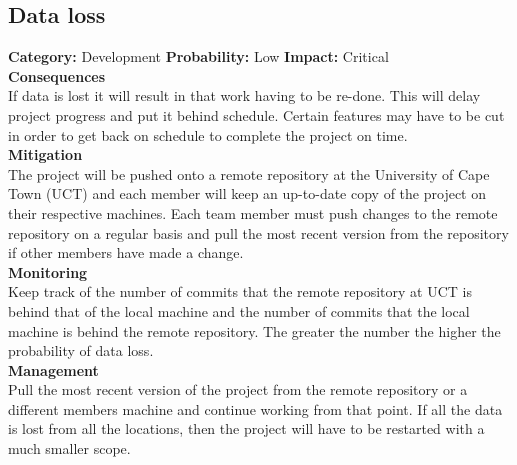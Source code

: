 \documentclass[a4paper,10pt]{article}
\begin{document}
		\subsection{Data loss}
		\textbf{Category:} Development\newline
		\textbf{Probability:} Low\newline
		\textbf{Impact:} Critical
		\\\textbf{Consequences}\\
		If data is lost it will result in that work having to be re-done. This will delay project progress and put it behind schedule. Certain features may have to be cut in order to get back on schedule to complete the project on time.
		\smallskip\\\textbf{Mitigation}\\
		The project will be pushed onto a remote repository at the University of Cape Town (UCT) and each member will keep an up-to-date copy of the project on their respective machines. Each team member must push changes to the remote repository on a regular basis and pull the most recent version from the repository if other members have made a change.
		\smallskip\\\textbf{Monitoring}\\
		Keep track of the number of commits that the remote repository at UCT is behind that of the local machine and the number of commits that the local machine is behind the remote repository. The greater the number the higher the probability of data loss.
		\smallskip\\\textbf{Management}\\
		Pull the most recent version of the project from the remote repository or a different members machine and continue working from that point. If all the data is lost from all the locations, then the project will have to be restarted with a much smaller scope.
\end{document}
